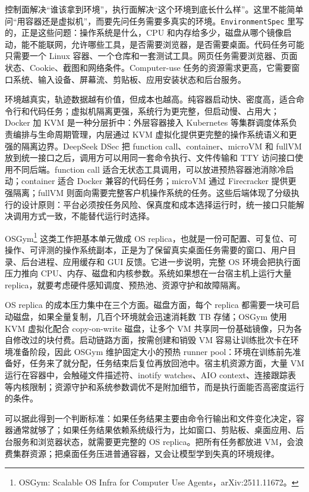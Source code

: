 控制面解决“谁该拿到环境”，执行面解决“这个环境到底长什么样”。这里不能简单问“用容器还是虚拟机”，而要先问任务需要多真实的环境。\texttt{EnvironmentSpec} 里写的，正是这些问题：操作系统是什么，CPU 和内存给多少，磁盘从哪个镜像启动，能不能联网，允许哪些工具，是否需要浏览器，是否需要桌面。代码任务可能只需要一个 Linux 容器、一个仓库和一套测试工具。网页任务需要浏览器、页面状态、Cookie、截图和网络条件。Computer-use 任务的资源需求更高，它需要窗口系统、输入设备、屏幕流、剪贴板、应用安装状态和后台服务。

环境越真实，轨迹数据越有价值，但成本也越高。纯容器启动快、密度高，适合命令行和代码任务；虚拟机隔离更强，系统行为更完整，但启动慢、占用大；Docker 加 KVM 是一种分层折中：外层容器接入 Kubernetes 等集群调度体系负责编排与生命周期管理，内层通过 KVM 虚拟化提供更完整的操作系统语义和更强的隔离边界。DeepSeek DSec 把 function call、container、microVM 和 fullVM 放到统一接口之后，调用方可以用同一套命令执行、文件传输和 TTY 访问接口使用不同后端。function call 适合无状态工具调用，可以放进预热容器池消除冷启动；container 适合 Docker 兼容的代码任务；microVM 通过 Firecracker 提供更强隔离；fullVM 则面向需要完整客户机操作系统的任务。这些后端体现了分级执行的设计原则：平台必须按任务风险、保真度和成本选择运行时，统一接口只能解决调用方式一致，不能替代运行时选择。

OSGym\footnote{OSGym: Scalable OS Infra for Computer Use Agents，arXiv:2511.11672。} 这类工作把基本单元做成 OS replica，也就是一份可配置、可复位、可操作、可评测的操作系统副本，正是为了保留真实桌面任务需要的窗口、用户目录、后台进程、应用缓存和 GUI 反馈。它进一步说明，完整 OS 环境会把执行面压力推向 CPU、内存、磁盘和内核参数。系统如果想在一台宿主机上运行大量 replica，就要考虑硬件感知调度、预热池、资源守护和故障隔离。

OS replica 的成本压力集中在三个方面。磁盘方面，每个 replica 都需要一块可启动磁盘，如果全量复制，几百个环境就会迅速消耗数 TB 存储；OSGym 使用 KVM 虚拟化配合 copy-on-write 磁盘，让多个 VM 共享同一份基础镜像，只为各自修改过的块付费。启动链路方面，按需创建和销毁 VM 容易让训练批次卡在环境准备阶段，因此 OSGym 维护固定大小的预热 runner pool：环境在训练前先准备好，任务来了就分配，任务结束后复位再放回池中。宿主机资源方面，大量 VM 运行在容器中，会触碰文件描述符、inotify watches、AIO context、连接跟踪表等内核限制；资源守护和系统参数调优不是附加细节，而是执行面能否高密度运行的条件。

可以据此得到一个判断标准：如果任务结果主要由命令行输出和文件变化决定，容器通常就够了；如果任务结果依赖系统级行为，比如窗口、剪贴板、桌面应用、后台服务和浏览器状态，就需要更完整的 OS replica。把所有任务都放进 VM，会浪费集群资源；把桌面任务压进普通容器，又会让模型学到失真的环境规律。

